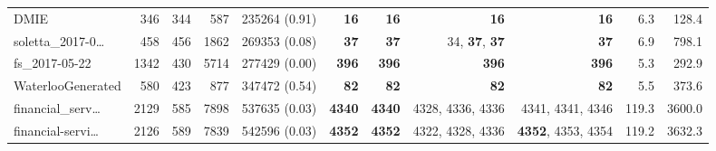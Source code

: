 \begin{table*}
\begin{tiny}
{\begin{tabular}{lrrrrrrrrrr}
DMIE & \num[text-series-to-math=true]{346} & \num[text-series-to-math=true]{344} & \num[text-series-to-math=true]{587} & \num[text-series-to-math=true]{235264} (\num[text-series-to-math=true]{0.91}) & \textbf{\num[text-series-to-math=true]{16}} & \textbf{\num[text-series-to-math=true]{16}} & \textbf{\num[text-series-to-math=true]{16}} & \textbf{\num[text-series-to-math=true]{16}} & 6.3 & 128.4\\
soletta\_2017-0\ldots & \num[text-series-to-math=true]{458} & \num[text-series-to-math=true]{456} & \num[text-series-to-math=true]{1862} & \num[text-series-to-math=true]{269353} (\num[text-series-to-math=true]{0.08}) & \textbf{\num[text-series-to-math=true]{37}} & \textbf{\num[text-series-to-math=true]{37}} & \num[text-series-to-math=true]{34}, \textbf{\num[text-series-to-math=true]{37}}, \textbf{\num[text-series-to-math=true]{37}} & \textbf{\num[text-series-to-math=true]{37}} & 6.9 & 798.1\\
fs\_2017-05-22 & \num[text-series-to-math=true]{1342} & \num[text-series-to-math=true]{430} & \num[text-series-to-math=true]{5714} & \num[text-series-to-math=true]{277429} (\num[text-series-to-math=true]{0.00}) & \textbf{\num[text-series-to-math=true]{396}} & \textbf{\num[text-series-to-math=true]{396}} & \textbf{\num[text-series-to-math=true]{396}} & \textbf{\num[text-series-to-math=true]{396}} & 5.3 & 292.9\\
WaterlooGenerated & \num[text-series-to-math=true]{580} & \num[text-series-to-math=true]{423} & \num[text-series-to-math=true]{877} & \num[text-series-to-math=true]{347472} (\num[text-series-to-math=true]{0.54}) & \textbf{\num[text-series-to-math=true]{82}} & \textbf{\num[text-series-to-math=true]{82}} & \textbf{\num[text-series-to-math=true]{82}} & \textbf{\num[text-series-to-math=true]{82}} & 5.5 & 373.6\\
financial\_serv\ldots & \num[text-series-to-math=true]{2129} & \num[text-series-to-math=true]{585} & \num[text-series-to-math=true]{7898} & \num[text-series-to-math=true]{537635} (\num[text-series-to-math=true]{0.03}) & \textbf{\num[text-series-to-math=true]{4340}} & \textbf{\num[text-series-to-math=true]{4340}} & \num[text-series-to-math=true]{4328}, \num[text-series-to-math=true]{4336}, \num[text-series-to-math=true]{4336} & \num[text-series-to-math=true]{4341}, \num[text-series-to-math=true]{4341}, \num[text-series-to-math=true]{4346} & 119.3 & 3600.0\\
financial-servi\ldots & \num[text-series-to-math=true]{2126} & \num[text-series-to-math=true]{589} & \num[text-series-to-math=true]{7839} & \num[text-series-to-math=true]{542596} (\num[text-series-to-math=true]{0.03}) & \textbf{\num[text-series-to-math=true]{4352}} & \textbf{\num[text-series-to-math=true]{4352}} & \num[text-series-to-math=true]{4322}, \num[text-series-to-math=true]{4328}, \num[text-series-to-math=true]{4336} & \textbf{\num[text-series-to-math=true]{4352}}, \num[text-series-to-math=true]{4353}, \num[text-series-to-math=true]{4354} & 119.2 & 3632.3\\

\end{tabular}}
\end{tiny}
\end{table*}
